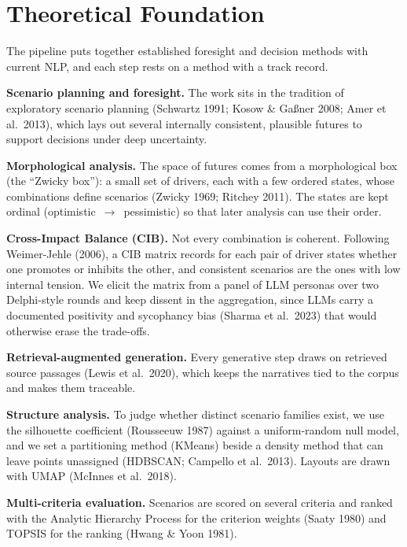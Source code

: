 \documentclass[11pt,a4paper]{article}
\begin{document}
\section{Theoretical Foundation}\label{sec:theory}
The pipeline puts together established foresight and decision methods with current NLP, and each step rests
on a method with a track record.

\textbf{Scenario planning and foresight.} The work sits in the tradition of exploratory scenario planning
(Schwartz 1991; Kosow \& Gaßner 2008; Amer et al.\ 2013), which lays out several internally consistent,
plausible futures to support decisions under deep uncertainty.

\textbf{Morphological analysis.} The space of futures comes from a morphological box (the \enquote{Zwicky
box}): a small set of drivers, each with a few ordered states, whose combinations define scenarios (Zwicky
1969; Ritchey 2011). The states are kept ordinal (optimistic~$\to$~pessimistic) so that later analysis can
use their order.

\textbf{Cross-Impact Balance (CIB).} Not every combination is coherent. Following Weimer-Jehle (2006), a CIB
matrix records for each pair of driver states whether one promotes or inhibits the other, and consistent
scenarios are the ones with low internal tension. We elicit the matrix from a panel of LLM personas over two
Delphi-style rounds and keep dissent in the aggregation, since LLMs carry a documented positivity and
sycophancy bias (Sharma et al.\ 2023) that would otherwise erase the trade-offs.

\textbf{Retrieval-augmented generation.} Every generative step draws on retrieved source passages (Lewis et
al.\ 2020), which keeps the narratives tied to the corpus and makes them traceable.

\textbf{Structure analysis.} To judge whether distinct scenario families exist, we use the silhouette
coefficient (Rousseeuw 1987) against a uniform-random null model, and we set a partitioning method (KMeans)
beside a density method that can leave points unassigned (HDBSCAN; Campello et al.\ 2013). Layouts are drawn
with UMAP (McInnes et al.\ 2018).

\textbf{Multi-criteria evaluation.} Scenarios are scored on several criteria and ranked with the Analytic
Hierarchy Process for the criterion weights (Saaty 1980) and TOPSIS for the ranking (Hwang \& Yoon 1981).

\end{document}
